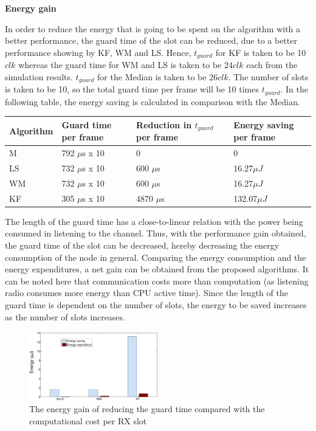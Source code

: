 \documentclass[journal]{IEEEtran}
\begin{document}
\textbf{Energy gain}\par \noindent
In order to reduce the energy that is going to be spent on the algorithm with a better performance, the guard time of the slot can be reduced, due to a better performance showing by KF, WM and LS.
Hence, $t_{guard}$ for KF is taken to be 10$clk$ whereas the guard time for WM and LS is taken to be $24clk$ each from the simulation results. $t_{guard}$ for the Median is taken to be 26$clk$. The number of slots is taken to be 10, so the total guard time per frame will be 10 times $t_{guard}$. In the following table, the energy saving is calculated in comparison with the Median.
\begin{center}
    \begin{tabular}{ |p{1.5cm} | p{2cm} |p{2cm} | p{1.75cm} |  }
    \hline \hline
    Algorithm & Guard time per frame & Reduction in $t_{guard}$ per frame & Energy saving per frame\\ \hline
   M &  792 $\mu$s x 10 & 0 & 0 \\ \hline
    LS & 732 $\mu$s x 10 & 600 $\mu$s & 16.27$\mu J$\\ \hline
    WM &   732 $\mu$s x 10 & 600 $\mu$s & 16.27$\mu J$ \\ \hline
    KF &  305 $\mu$s x 10 & 4870 $\mu$s & 132.07$\mu J$\\ \hline
    \end{tabular}
\end{center}
The length of the guard time has a close-to-linear relation with the power being consumed in listening to the channel. Thus, with the performance gain obtained, the guard time of the slot can be decreased, hereby decreasing the energy consumption of the node in general. Comparing the energy consumption and the energy expenditures, a net gain can be obtained from the proposed algorithms. It can be noted here that communication costs more than computation (as listening radio consumes more energy than CPU active time). Since the length of the guard time is dependent on the number of slots, the energy to be saved increases as the number of slots increases.
\begin{figure}
\centering
\includegraphics[width=0.5\textwidth]{commvscompute}
\caption{The energy gain of reducing the guard time compared with
the computational cost per RX slot} \label{guardsave}
\end{figure}
\end{document}
